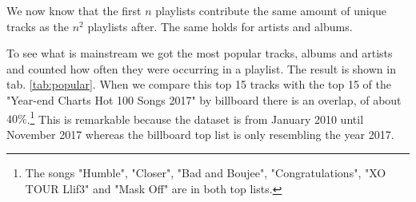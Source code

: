 We now know that the first $n$ playlists contribute the same amount of unique tracks as the $n^2$ playlists after. The same holds for artists and albums.%

To see what is mainstream we got the most popular tracks, albums and artists and counted how often they were occurring in a playlist. The result is shown in tab. \ref{tab:popular}. When we compare this top 15 tracks with the top 15 of the "Year-end Charts Hot 100 Songs 2017" by billboard there is an overlap, of about $40 \%$.\footnote{The songs "Humble", "Closer", "Bad and Boujee", "Congratulations", "XO TOUR Llif3" and "Mask Off" are in both top lists.}\citep{BillboardMedia} This is remarkable because the dataset is from January 2010 until November 2017 whereas the billboard top list is only resembling the year 2017.

